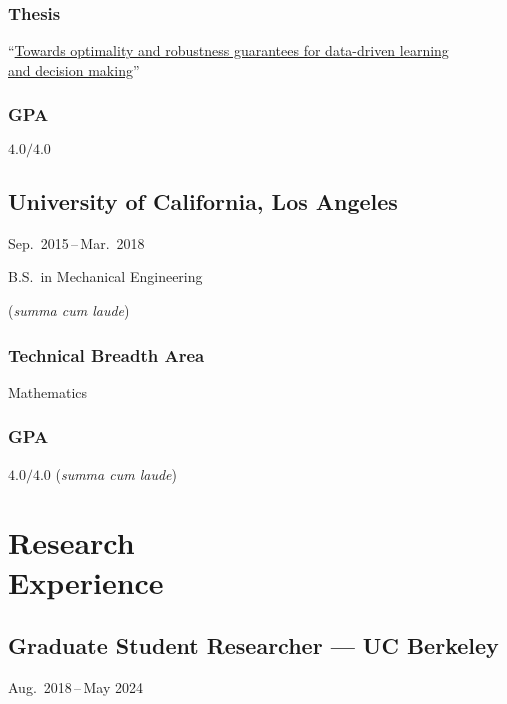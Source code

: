 \documentclass[11pt]{article}
\newcommand{\sectionwidth}{1in}		%
\newcommand{\subsectionskip}{\baselineskip}	%
\newcommand{\cvdates}[2]{\hfill#1\,--\,#2}	%
\begin{document}
	\subsubsection{Thesis}
	``\href{https://brendon-anderson.github.io/files/publications/ms_thesis.pdf}{Towards optimality and robustness guarantees for data-driven learning \\
	\hspace*{\sectionwidth}and decision making}''
	
	\begin{gpa-on}
		\subsubsection{GPA}
		$4.0/4.0$
	\end{gpa-on}
	
	\vspace*{\subsectionskip}
	
	\subsection{University of California, Los Angeles}
	\cvdates{Sep.\ 2015}{Mar.\ 2018}
	
	\hspace*{\sectionwidth}B.S.\ in Mechanical Engineering
	\begin{gpa-off}
		(\textit{summa cum laude})
	\end{gpa-off}
	
	\subsubsection{Technical Breadth Area}
	Mathematics
	
	\begin{gpa-on}
		\subsubsection{GPA}
		$4.0/4.0$ (\textit{summa cum laude})
	\end{gpa-on}
	
	\section{\texorpdfstring{Research \\[\baselineskip] Experience}{Research Experience}}
	\hfill\vspace*{-2\baselineskip}

	\subsection{Graduate Student Researcher --- UC Berkeley}
	\cvdates{Aug.\ 2018}{May 2024}
	
\end{document}
